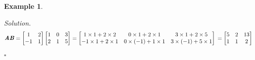 \documentclass[12pt, a4paper]{article}
\newtheorem{eg}{Example}[subsection]
\newenvironment*{sol}{\indent\textit{Solution. }}{\hfill{$\square$}\par}
\def\matrixA{\textbf{\emph{A}}}
\def\matrixB{\textbf{\emph{B}}}
\begin{document}
\begin{eg}
\begin{enumerate}
	\begin{sol}\[	\matrixA\matrixB=\begin{bmatrix}1&2\\-1&1\end{bmatrix}\begin{bmatrix}1&0&3\\2&1&5\end{bmatrix}=\begin{bmatrix}1\times1+2\times2&0\times1+2\times1&3\times1+2\times5\\-1\times1+2\times1&0\times(-1)+1\times1&3\times(-1)+5\times1\end{bmatrix}\\=\begin{bmatrix}5&2&13\\1&1&2\end{bmatrix}\]\end{sol}
\end{enumerate}	
\end{eg}
\end{document}
